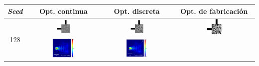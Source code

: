 \begin{table}[ht]
    \centering
    \vspace*{-2.5cm}
    \hspace*{-3cm}
    \begin{tabular}{|c|c|c|c|}
    \hline 
    \emph{Seed} & Opt. continua & Opt. discreta &  Opt. de fabricación \\
    \hline
      \multirow{2}{*}{128} &
      \includegraphics[width=0.20\textwidth]{image/results/bend/MMA/visualize_eps_cont_128.png} &
      \includegraphics[width=0.20\textwidth]{image/results/bend/MMA/visualize_eps_disc_128.png} &
      \includegraphics[width=0.20\textwidth]{image/results/bend/MMA/visualize_eps_fab_128.png} \\
      \cline{2-4}
      &
      \includegraphics[width=0.33\textwidth]{image/results/bend/MMA/visualize_field_cont_128.png} &
      \includegraphics[width=0.33\textwidth]{image/results/bend/MMA/visualize_field_disc_128.png} &

\end{tabular}
\end{table}
